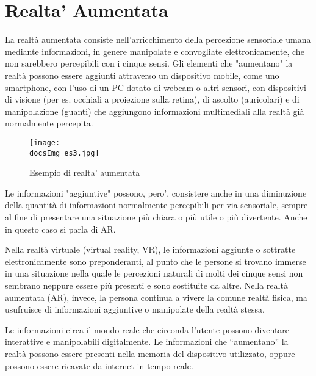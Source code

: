 \section{Realta' Aumentata}
La realtà aumentata consiste nell'arricchimento della percezione sensoriale umana mediante informazioni, in genere manipolate e convogliate elettronicamente, che non sarebbero percepibili con i cinque sensi.
Gli elementi che "aumentano" la realtà possono essere aggiunti attraverso un dispositivo mobile, come uno smartphone, con l'uso di un PC dotato di webcam o altri sensori, con dispositivi di visione (per es. occhiali a proiezione sulla retina), di ascolto (auricolari) e di manipolazione (guanti) che aggiungono informazioni multimediali alla realtà già normalmente percepita.

\begin{figure}[H]
	\centering
	\texttt{[image: \\docsImg es3.jpg]}
	\caption{Esempio di realta' aumentata}
	\label{fig:Esempio di realta' aumentata presente nell'app Experenti - Motore}
\end{figure}

Le informazioni "aggiuntive" possono, pero', consistere anche in una diminuzione della quantità di informazioni normalmente percepibili per via sensoriale, sempre al fine di presentare una situazione più chiara o più utile o più divertente. Anche in questo caso si parla di AR.

Nella realtà virtuale (virtual reality, VR), le informazioni aggiunte o sottratte elettronicamente sono preponderanti, al punto che le persone si trovano immerse in una situazione nella quale le percezioni naturali di molti dei cinque sensi non sembrano neppure essere più presenti e sono sostituite da altre. Nella realtà aumentata (AR), invece, la persona continua a vivere la comune realtà fisica, ma usufruisce di informazioni aggiuntive o manipolate della realtà stessa.

Le informazioni circa il mondo reale che circonda l'utente possono diventare interattive e manipolabili digitalmente.
Le informazioni che “aumentano” la realtà possono essere presenti nella memoria del dispositivo utilizzato, oppure possono essere ricavate da internet in tempo reale.

